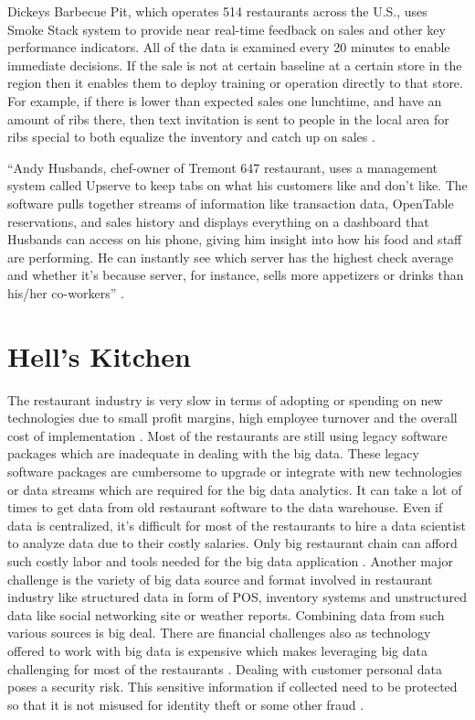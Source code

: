 \documentclass[sigconf]{acmart}
\begin{document}
Dickeys Barbecue Pit, which operates 514 restaurants across the U.S., uses Smoke Stack system to provide near real-time feedback on sales and other key performance indicators. All of the data is examined every 20 minutes to enable immediate decisions. If the sale is not at certain baseline at a certain store in the region then it enables them to deploy training or operation directly to that store. For example, if there is lower than expected sales one lunchtime, and have an amount of ribs there, then text invitation is sent to people in the local area for ribs special to both equalize the inventory and catch up on sales \cite{www-forbes}.
 
``Andy Husbands, chef-owner of Tremont 647 restaurant, uses a management system called Upserve to keep tabs on what his customers like and don't like. 
The software pulls together streams of information like transaction data, OpenTable reservations, and sales history and displays everything on a dashboard that Husbands can access on his phone, giving him insight into how his food and staff are performing. He can instantly see which server has the highest check 
average and whether it's because server, for instance, sells more appetizers or drinks than his/her co-workers'' \cite{www-bostonglobe}.

\section{Hell's Kitchen}
The restaurant industry is very slow in terms of adopting or spending on new technologies due to small profit margins, high employee turnover and the overall cost of implementation \cite{www-bostonglobe}. Most of the restaurants are still using legacy software packages which are inadequate in dealing with the big data. These legacy software packages are cumbersome to upgrade or integrate with new technologies or data streams which are required for the big data analytics. It can take a lot of times to get data from old restaurant software to the data warehouse. Even if data is centralized, it's difficult for most of the restaurants to hire a data scientist to analyze data due to their costly salaries. Only big restaurant chain can afford such costly labor and tools needed for the big data application \cite{2015BDLC}. Another major challenge is the variety of big data source and format involved in restaurant industry like structured data in form of POS, inventory systems and unstructured data like social networking site or weather reports. Combining data from such various sources is big deal. There are financial challenges also as technology offered to work with big data is expensive which makes leveraging big data challenging for most of the restaurants \cite{www-foodnewsfeed}. Dealing with customer personal data poses a security risk. This sensitive information if collected need to be protected so that it is not misused for identity theft or some other fraud \cite{www-restaurant}.
\end{document}
